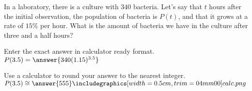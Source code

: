 \documentclass{ximera}
\author{Ivo Terek}
\begin{document}
\begin{exercise}

In a laboratory, there is a culture with $340$ bacteria. Let's say that $t$ hours after the initial observation, the population of bacteria is $P(t)$, and that it grows at a rate of $15\%$ per hour. What is the amount of bacteria we have in the culture after three and a half hours? 

Enter the exact answer in calculator ready format.  $P(3.5)=\answer{340(1.15)^{3.5}}$

Use a calculator to round your answer to the nearest integer. $P(3.5)\cong \answer{555} \calcHW$

\end{exercise}
\end{document}
